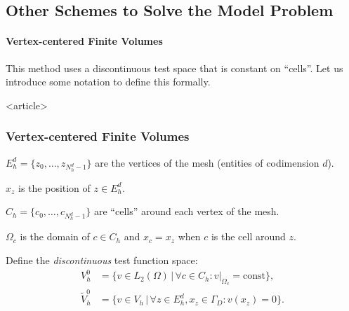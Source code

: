\subsection{Other Schemes to Solve the Model Problem}

\paragraph{Vertex-centered Finite Volumes}

This method uses a discontinuous test space that is constant on
``cells''. Let us introduce some notation to define this formally.

\begin{frame}<article>
\frametitle<presentation>{Vertex-centered Finite Volumes}
\begin{window}
$E_h^d=\{z_0,\ldots,z_{N_h^d-1}\}$ are the vertices of the mesh
(entities of codimension $d$). 

$x_z$ is the position of $z\in E_h^d$.

$C_h = \{c_0,\ldots,c_{N_h^d-1}\}$ are ``cells'' around each vertex of
the mesh.
\end{window}

$\Omega_c$ is the domain of $c\in C_h$ and $x_c=x_z$ when $c$ is the
cell around $z$.

Define the \textit{discontinuous} test function space:
\begin{align*}
V_h^0 & = \{ v\in L_2(\Omega) \,|\, \forall c\in C_h : v|_{\Omega_c} =
\text{const} \},\\
\tilde{V}_h^0 &= \{ v\in V_h \,|\, \forall z\in E_h^d, x_z\in\Gamma_D : v(x_z)=0\}.
\end{align*}

\end{frame}

